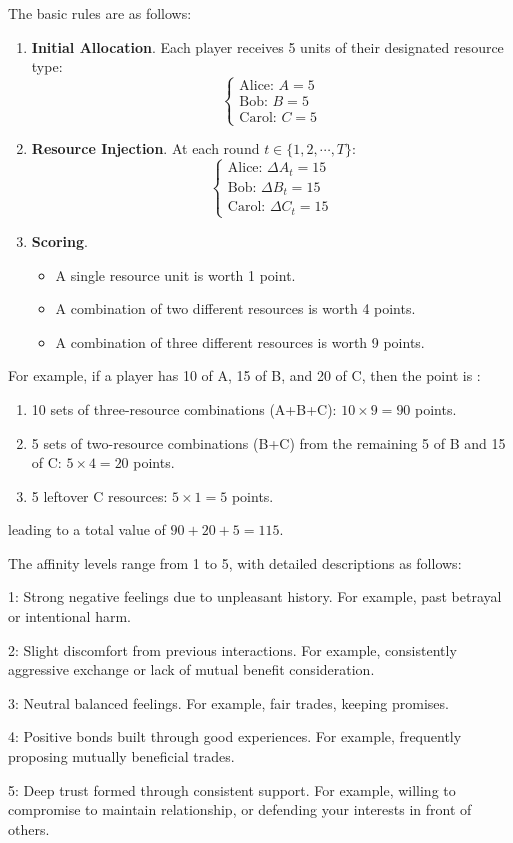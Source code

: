 The basic rules are as follows:

\begin{enumerate}
    \item \textbf{Initial Allocation}. Each player receives 5 units of their designated resource type:
$$\begin{cases}\text{Alice: } A=5 \\ \text{Bob: } B=5 \\ \text{Carol: } C=5 \end{cases}$$
\item \textbf{Resource Injection}. At each round $t\in \{1, 2, \cdots, T\}$:
$$\begin{cases}\text{Alice: } \Delta A_t=15 \\ \text{Bob: } \Delta B_t=15 \\ \text{Carol: } \Delta C_t=15 \end{cases}$$
\item \textbf{Scoring}. \begin{itemize}
    \item A single resource unit is worth 1 point.
    \item A combination of two different resources is worth 4 points.  
    \item A combination of three different resources is worth 9 points.
\end{itemize} 
\end{enumerate}


   

For example, if a player has 10 of A, 15 of B, and 20 of C, then the point is :

\begin{enumerate}
    \item 10 sets of three-resource combinations (A+B+C): \(10 \times 9 = 90\) points.  
    \item 5 sets of two-resource combinations (B+C) from the remaining 5 of B and 15 of C: \(5 \times 4 = 20\) points.
    \item  5 leftover C resources: \(5 \times 1 = 5\) points.  
\end{enumerate} 
leading to a total value of \(90 + 20 + 5 = 115\).  



The affinity levels range from 1 to 5, with detailed descriptions as follows:
\begin{tcolorbox}[colback=black!3!white,colframe=black!30!white,arc=0.1cm]
1: Strong negative feelings due to unpleasant history. For example, past betrayal or intentional harm.

2: Slight discomfort from previous interactions. For example, consistently aggressive exchange or lack of mutual benefit consideration.

3: Neutral balanced feelings. For example, fair trades, keeping promises.

4: Positive bonds built through good experiences. For example, frequently proposing mutually beneficial trades.

5: Deep trust formed through consistent support. For example, willing to compromise to maintain relationship, or defending your interests in front of others.
\end{tcolorbox}

